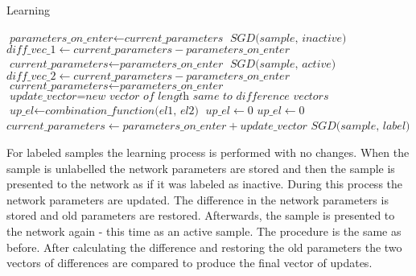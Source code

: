 \documentclass[a4paper,10pt]{report}
\begin{document}
      \begin{algorithm}
      \caption{Learning}\label{euclid}
      \begin{algorithmic}[1]
	\State $\textit{parameters\_on\_enter} \gets \textit{current\_parameters}$
	\State
	\State $\textit{SGD(sample, inactive)}$
	\State $\textit{diff\_vec\_1} \gets \textit{current\_parameters} -\textit{parameters\_on\_enter}$
	\State $\textit{current\_parameters} \gets \textit{parameters\_on\_enter}$
	\State
	\State $\textit{SGD(sample, active)}$
	\State $\textit{diff\_vec\_2} \gets \textit{current\_parameters} - \textit{parameters\_on\_enter}$
	\State $\textit{current\_parameters} \gets \textit{parameters\_on\_enter}$
	\State
	\State $\textit{update\_vector} = \textit{new vector of length same to difference vectors}$
	    \State $\textit{up\_el} \gets \textit{combination\_function(el1, el2)}$
	  \Else
	    \State $\textit{up\_el} \gets 0$
	  \EndIf
	\EndFor
	\State
	    \State $\textit{up\_el} \gets 0$
	  \EndIf
	\EndFor
	\State
	\State $\textit{current\_parameters} \gets \textit{parameters\_on\_enter} + \textit{update\_vector}$
	\Else
	\State $\textit{SGD(sample, label)}$
      \EndIf
      \EndProcedure
      \end{algorithmic}
      \end{algorithm}
      
      For labeled samples the learning process is performed with no changes. When the sample is unlabelled the network parameters are stored and then the sample is presented to the network as if it was labeled as inactive. During this process the network parameters are updated. The difference in the network parameters is stored and old parameters are restored. Afterwards, the sample is presented to the network again - this time as an active sample. The procedure is the same as before. After calculating the difference and restoring the old parameters the two vectors of differences are compared to produce the final vector of updates. 
           
\end{document}
